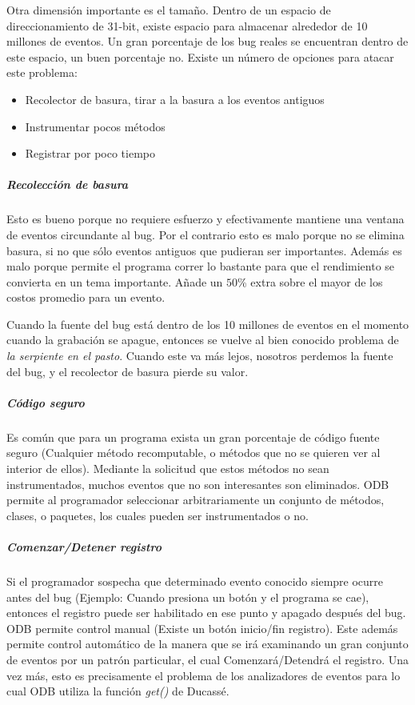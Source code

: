 \documentclass[12pt,legalpaper]{report}
\begin{document}
Otra dimensión importante es el tamaño.  Dentro de un espacio de direccionamiento de 31-bit, existe espacio para almacenar alrededor de 10 millones de eventos.  Un gran porcentaje de los bug reales se encuentran dentro de este espacio, un buen porcentaje no.  Existe un número de opciones para atacar este problema:
\begin{itemize}
	\item Recolector de basura, tirar a la basura a los eventos antiguos
	\item Instrumentar pocos métodos
	\item Registrar por poco tiempo 
\end{itemize}

					\subparagraph{Recolección de basura}

Esto es bueno porque no requiere esfuerzo y efectivamente mantiene una ventana de eventos circundante al bug.  Por el contrario esto es malo porque no se elimina basura, si no que sólo eventos antiguos que pudieran ser importantes.  Además es malo porque permite el programa correr lo bastante para que el rendimiento se convierta en un tema importante.  Añade un $50$\% extra sobre el mayor de los costos promedio para un evento.

Cuando la fuente del bug está dentro de los 10 millones de eventos en el momento cuando la grabación se apague, entonces se vuelve al bien conocido problema de \textit{la serpiente en el pasto}. Cuando este va más lejos, nosotros perdemos la fuente del bug, y el recolector de basura pierde su valor.

					\subparagraph{Código seguro}

Es común que para un programa exista un gran porcentaje de código fuente seguro (Cualquier método recomputable, o métodos que no se quieren ver al interior de ellos).  Mediante la solicitud que estos métodos no sean instrumentados, muchos eventos que no son interesantes son eliminados.  ODB permite al programador seleccionar arbitrariamente un conjunto de métodos, clases, o paquetes, los cuales pueden ser instrumentados o no.

					\subparagraph{Comenzar/Detener registro}

Si el programador sospecha que determinado evento conocido siempre ocurre antes del bug (Ejemplo: Cuando presiona un botón y el programa se cae), entonces el registro puede ser habilitado en ese punto y apagado después del bug.  ODB permite control manual (Existe un botón inicio/fin registro).  Este además permite control automático de la manera que se irá examinando un gran conjunto de eventos por un patrón particular, el cual Comenzará/Detendrá el registro.  Una vez más, esto es precisamente el problema de los analizadores de eventos para lo cual ODB utiliza la función \textit{get()} de Ducassé.
\end{document}
